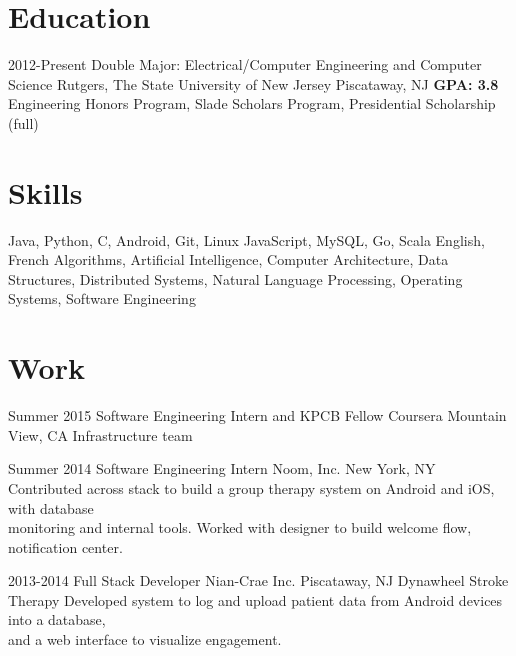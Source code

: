 \documentclass[11pt,letterpaper]{moderncv}
\begin{document}
\maketitle

\section{Education}
\cventry
    {2012-Present}
    {Double Major: Electrical/Computer Engineering and Computer Science}
    {\break Rutgers, The State University of New Jersey}
    {Piscataway, NJ}
    {\textbf{GPA: 3.8}}
    {Engineering Honors Program, Slade Scholars Program, Presidential Scholarship (full)}

\section{Skills}
       {Java, Python, C, Android, Git, Linux}
       {JavaScript, MySQL, Go, Scala}
       {English, French}
       {Algorithms, Artificial Intelligence, Computer Architecture, Data Structures, Distributed Systems, Natural Language Processing, Operating Systems, Software Engineering}

\section{Work}
    \cventry
        {Summer 2015}
        {Software Engineering Intern and KPCB Fellow}
        {Coursera}
        {Mountain View, CA}
        {}
        {Infrastructure team\\}

    \cventry
        {Summer 2014}
        {Software Engineering Intern}
        {Noom, Inc.}
        {New York, NY}
        {}
        {Contributed across stack to build a group therapy system on Android and iOS, with database\\monitoring and internal tools. Worked with designer to build welcome flow, notification center.\\}

    \cventry
        {2013-2014}
        {Full Stack Developer}
        {Nian-Crae Inc.}
        {Piscataway, NJ}
        {Dynawheel Stroke Therapy}
        {Developed system to log and upload patient data from Android devices into a database,\\and a web interface to visualize engagement.\\}
\end{document}
